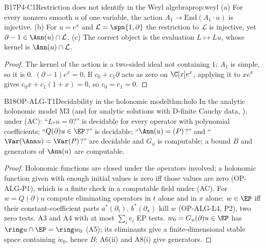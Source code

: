 \begin{dimcard}{B17}{P4-C1}{Restriction does not identify in the Weyl algebra}{\pw}{prop:weyl}
(a) For every nonzero smooth $u$ of one variable, the action $A_1\to\mathrm{End}(A_1\cdot u)$ is injective. (b) For $u=e^x$ and $\mathcal L=\spn\{1,\partial\}$ the restriction to $\mathcal L$ is injective, yet $\partial-1\in\Ann(u)\cap\mathcal L$. (c) The correct object is the evaluation $L\mapsto Lu$, whose kernel is $\Ann(u)\cap\mathcal L$.
\end{dimcard}
\begin{proof}
The kernel of the action is a two-sided ideal not containing $1$; $A_1$ is simple, so it is $0$.
$(\partial-1)e^x=0$. If $c_0+c_1\partial$ acts as zero on $\C[x]e^x$, applying it to $xe^x$ gives $c_0x+c_1(1+x)=0$, so $c_0=c_1=0$.
\end{proof}

\begin{dimcard}{B18}{OP-ALG-T1}{Decidability in the holonomic model}{}{thm:holo}
\label{dim:P4-T6}%
In the analytic holonomic model M3 (and for analytic solutions with D-finite Cauchy data, ), under (AC): ``$L_*u=0$?'' is decidable for every operator with polynomial coefficients; ``$Q(\partial)u\in\EP$?'' is decidable; ``$\Ann(u)=(P)$?'' and ``$\Var(\Ann u)=\Var(P)$?'' are decidable and $G_u$ is computable; a bound $B$ and generators of $\Ann(u)$ are computable.
\end{dimcard}
\begin{proof}
Holonomic functions are closed under the operators involved; a holonomic function given with enough initial values is zero iff those values are zero (OP-ALG-P1), which is a finite check in a computable field under (AC).
For $w=Q(\partial)u$ compute eliminating operators in $t$ alone and in $x$ alone; $w\in\EP$ iff their constant-coefficient parts $a^*(\partial_t)$, $b^*(\partial_x)$ kill $w$ (OP-ALG-L4, P2), two zero tests.
A3 and A4 with at most $\sum_ie_i$ EP tests.
$w_0=G_u(\partial)u\in\EP$ has $\ring u\cap\EP=\ring w_0$ (A5); its eliminants give a finite-dimensional stable space containing $\ring w_0$, hence $B$; A6(ii) and A8(i) give generators.
\end{proof}

